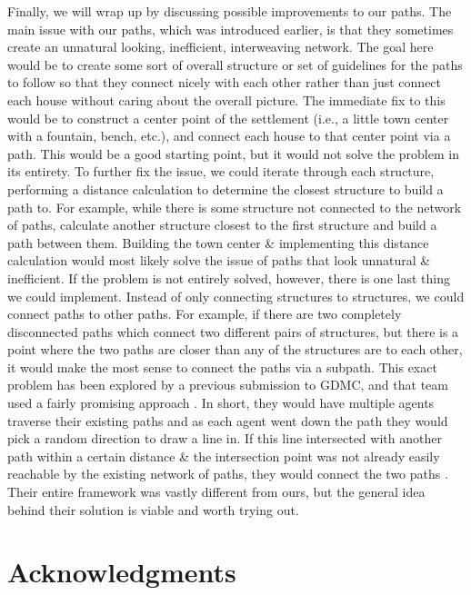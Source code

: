 \documentclass[11pt, oneside]{article}
\begin{document}
\begin{normalsize}
Finally, we will wrap up by discussing possible improvements to our paths. The main issue with our paths, which was introduced earlier, is that they sometimes create an unnatural looking, inefficient, interweaving network. The goal here would be to create some sort of overall structure or set of guidelines for the paths to follow so that they connect nicely with each other rather than just connect each house without caring about the overall picture. The immediate fix to this would be to construct a center point of the settlement (i.e., a little town center with a fountain, bench, etc.), and connect each house to that center point via a path. This would be a good starting point, but it would not solve the problem in its entirety. To further fix the issue, we could iterate through each structure, performing a distance calculation to determine the closest structure to build a path to. For example, while there is some structure not connected to the network of paths, calculate another structure closest to the first structure and build a path between them. Building the town center \& implementing this distance calculation would most likely solve the issue of paths that look unnatural \& inefficient. If the problem is not entirely solved, however, there is one last thing we could implement. Instead of only connecting structures to structures, we could connect paths to other paths. For example, if there are two completely disconnected paths which connect two different pairs of structures, but there is a point where the two paths are closer than any of the structures are to each other, it would make the most sense to connect the paths via a subpath. This exact problem has been explored by a previous submission to GDMC, and that team used a fairly promising approach \cite{esko2021multi}. In short, they would have multiple agents traverse their existing paths and as each agent went down the path they would pick a random direction to draw a line in. If this line intersected with another path within a certain distance \& the intersection point was not already easily reachable by the existing network of paths, they would connect the two paths \cite{esko2021multi}. Their entire framework was vastly different from ours, but the general idea behind their solution is viable and worth trying out.

\newpage

\section{Acknowledgments}
\label{Acknowledgments}


\end{normalsize}
\end{document}
